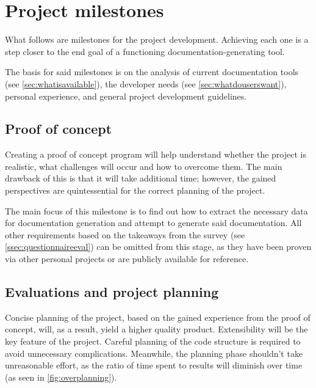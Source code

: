 \chapter{Project milestones}

What follows are milestones for the project development.
Achieving each one is a step closer to the end goal of a functioning documentation-generating tool.

The basis for said milestones is on the analysis of current documentation tools (see \ref{sec:whatisavailable}), the developer needs (see \ref{sec:whatdouserswant}), personal experience, and general project development guidelines.

\section{Proof of concept} \label{secProofOfConcept}

Creating a proof of concept program will help understand whether the project is realistic, what challenges will occur and how to overcome them.
The main drawback of this is that it will take additional time; however, the gained perspectives are quintessential for the correct planning of the project.

The main focus of this milestone is to find out how to extract the necessary data for documentation generation and attempt to generate said documentation.
All other requirements based on the takeaways from the survey (see \ref{ssec:questionnaireeval}) can be omitted from this stage, as they have been proven via other personal projects or are publicly available for reference.

\section{Evaluations and project planning} \label{secEvalProjPlanning}

Concise planning of the project, based on the gained experience from the proof of concept, will, as a result, yield a higher quality product.
Extensibility will be the key feature of the project. Careful planning of the code structure is required to avoid unnecessary complications.
Meanwhile, the planning phase shouldn't take unreasonable effort, as the ratio of time spent to results will diminish over time (as seen in \ref{fig:overplanning}). \cite{ruparelia_stop_2016}

